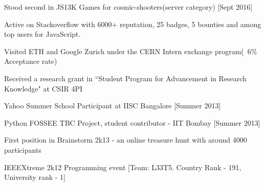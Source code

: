 

\begin{cventries}

  \begin{cvitems} %
    \item {Stood second in JS13K Games for cosmic-shooters(server category) [Sept 2016]}
    \item {Active on Stackoverflow with 6000+ reputation, 25 badges, 5 bounties and among top users for JavaScript.}
    \item {Visited ETH and Google Zurich under the CERN Intern exchange program(~6\% Acceptance rate)}
    \item {Received a research grant in ``Student Program for Advancement in Research Knowledge" at CSIR 4PI}
    \item {Yahoo Summer School Participant at IISC Bangalore [Summer 2013]}
    \item {Python FOSSEE TBC Project, student contributor - IIT Bombay [Summer 2013]}
    \item {First position in Brainstorm 2k13 - an online treasure hunt with around 4000 participants}
    \item {IEEEXtreme 2k12 Programming event [Team: L33T5. Country Rank - 191, University rank - 1]}
  \end{cvitems}

\end{cventries}
